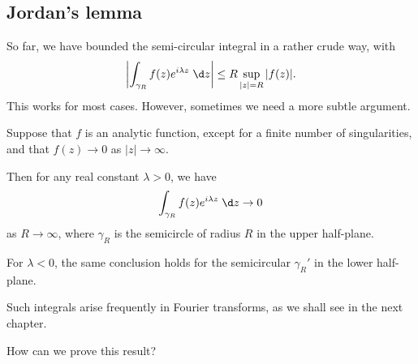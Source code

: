 \documentclass[a4paper]{article}
\begin{document}
\subsection{Jordan's lemma}
So far, we have bounded the semi-circular integral in a rather crude way, with
\[
  \left|\int_{\gamma_R} f(z) e^{i\lambda z} \;\d z\right| \leq R \sup_{|z| = R} |f(z)|.
\]
This works for most cases. However, sometimes we need a more subtle argument.
\begin{lemma}
  Suppose that $f$ is an analytic function, except for a finite number of singularities, and that $f(z) \to 0$ as $|z| \to \infty$.
  \begin{center}
  \end{center}
  Then for any real constant $\lambda > 0$, we have
  \[
    \int_{\gamma_R} f(z) e^{i\lambda z}\;\d z\to 0
  \]
  as $R \to \infty$, where $\gamma_R$ is the semicircle of radius $R$ in the upper half-plane.

  For $\lambda < 0$, the same conclusion holds for the semicircular $\gamma_R'$ in the lower half-plane.
\end{lemma}
Such integrals arise frequently in Fourier transforms, as we shall see in the next chapter.

How can we prove this result?
\end{document}
